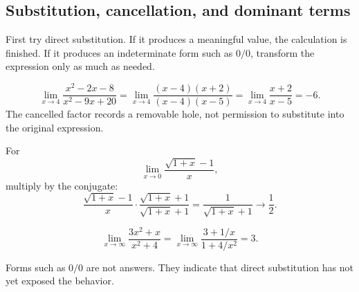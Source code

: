 \subsection{Substitution, cancellation, and dominant terms}

\begin{corebox}
First try direct substitution. If it produces a meaningful value, the calculation is finished. If it produces an indeterminate form such as $0/0$, transform the expression only as much as needed.
\end{corebox}

\begin{examplebox}
\[
\lim_{x\to4}\frac{x^2-2x-8}{x^2-9x+20}
=\lim_{x\to4}\frac{(x-4)(x+2)}{(x-4)(x-5)}
=\lim_{x\to4}\frac{x+2}{x-5}=-6.
\]
The cancelled factor records a removable hole, not permission to substitute into the original expression.
\end{examplebox}

\begin{examplebox}
For
\[
\lim_{x\to0}\frac{\sqrt{1+x}-1}{x},
\]
multiply by the conjugate:
\[
\frac{\sqrt{1+x}-1}{x}\cdot\frac{\sqrt{1+x}+1}{\sqrt{1+x}+1}
=\frac{1}{\sqrt{1+x}+1}\to\frac12.
\]
\end{examplebox}

\begin{examplebox}
\[
\lim_{x\to\infty}\frac{3x^2+x}{x^2+4}
=\lim_{x\to\infty}\frac{3+1/x}{1+4/x^2}=3.
\]
\end{examplebox}

\begin{remarkbox}
Forms such as $0/0$ are not answers. They indicate that direct substitution has not yet exposed the behavior.
\end{remarkbox}
